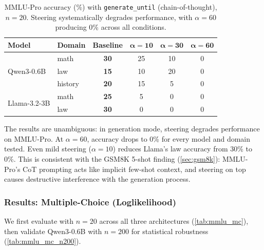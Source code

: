 \documentclass[11pt,a4paper]{article}
\begin{document}
\begin{table}[H]
\centering
\caption{MMLU-Pro accuracy (\%) with \texttt{generate\_until} (chain-of-thought), $n=20$. Steering systematically degrades performance, with $\alpha=60$ producing 0\% across all conditions.}
\label{tab:mmlu_gen}
\small
\begin{tabular}{ll cccc}
\toprule
\textbf{Model} & \textbf{Domain} & \textbf{Baseline} & $\boldsymbol{\alpha=10}$ & $\boldsymbol{\alpha=30}$ & $\boldsymbol{\alpha=60}$ \\
\midrule
\multirow{3}{*}{Qwen3-0.6B} & math & \textbf{30} & 25 & 10 & 0 \\
& law & \textbf{15} & 10 & 20 & 0 \\
& history & \textbf{20} & 15 & 5 & 0 \\
\midrule
\multirow{2}{*}{Llama-3.2-3B} & math & \textbf{25} & 5 & 0 & 0 \\
& law & \textbf{30} & 0 & 0 & 0 \\
\bottomrule
\end{tabular}
\end{table}

The results are unambiguous: in generation mode, steering degrades performance on MMLU-Pro. At $\alpha=60$, accuracy drops to 0\% for every model and domain tested. Even mild steering ($\alpha=10$) reduces Llama's law accuracy from 30\% to 0\%. This is consistent with the GSM8K 5-shot finding (\cref{sec:gsm8k}): MMLU-Pro's CoT prompting acts like implicit few-shot context, and steering on top causes destructive interference with the generation process.

\subsubsection{Results: Multiple-Choice (Loglikelihood)}

We first evaluate with $n=20$ across all three architectures (\cref{tab:mmlu_mc}), then validate Qwen3-0.6B with $n=200$ for statistical robustness (\cref{tab:mmlu_mc_n200}).
\end{document}
